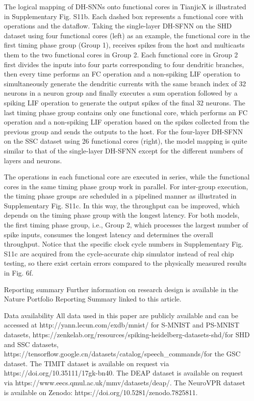 The logical mapping of DH-SNNs onto functional cores in TianjicX is illustrated in Supplementary Fig. S11b. Each dashed box represents a functional core with operations and the dataflow. Taking the single-layer DH-SFNN on the SHD dataset using four functional cores (left) as an example, the functional core in the first timing phase group (Group 1), receives spikes from the host and multicasts them to the two functional cores in Group 2. Each functional core in Group 2 first divides the inputs into four parts corresponding to four dendritic branches, then every time performs an FC operation and a non-spiking LIF operation to simultaneously generate the dendritic currents with the same branch index of 32 neurons in a neuron group and finally executes a sum operation followed by a spiking LIF operation to generate the output spikes of the final 32 neurons. The last timing phase group contains only one functional core, which performs an FC operation and a non-spiking LIF operation based on the spikes collected from the previous group and sends the outputs to the host. For the four-layer DH-SFNN on the SSC dataset using 26 functional cores (right), the model mapping is quite similar to that of the single-layer DH-SFNN except for the different numbers of layers and neurons.

The operations in each functional core are executed in series, while the functional cores in the same timing phase group work in parallel. For inter-group execution, the timing phase groups are scheduled in a pipelined manner as illustrated in Supplementary Fig. S11c. In this way, the throughput can be improved, which depends on the timing phase group with the longest latency. For both models, the first timing phase group, i.e., Group 2, which processes the largest number of spike inputs, consumes the longest latency and determines the overall throughput. Notice that the specific clock cycle numbers in Supplementary Fig. S11c are acquired from the cycle-accurate chip simulator instead of real chip testing, so there exist certain errors compared to the physically measured results in Fig. 6f.

Reporting summary
Further information on research design is available in the Nature Portfolio Reporting Summary linked to this article.

Data availability
All data used in this paper are publicly available and can be accessed at http://yann.lecun.com/exdb/mnist/ for S-MNIST and PS-MNIST datasets, https://zenkelab.org/resources/spiking-heidelberg-datasets-shd/for SHD and SSC datasets, https://tensorflow.google.cn/datasets/catalog/speech_commands/for the GSC dataset. The TIMIT dataset is available on request via https://doi.org/10.35111/17gk-bn40. The DEAP dataset is available on request via https://www.eecs.qmul.ac.uk/mmv/datasets/deap/. The NeuroVPR dataset is available on Zenodo: https://doi.org/10.5281/zenodo.7825811.

